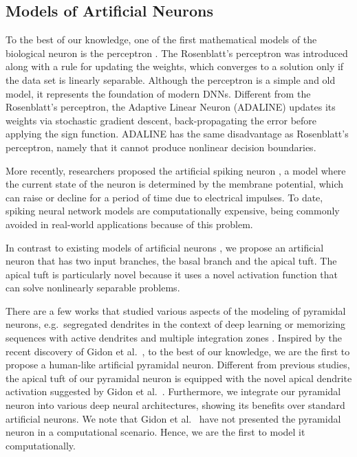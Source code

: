 \documentclass[pdflatex,sn-mathphys]{sn-jnl}
\theoremstyle{thmstyleone}
\theoremstyle{thmstyletwo}\newtheorem{example}{Example}\newtheorem{remark}{Remark}
\theoremstyle{thmstylethree}\newtheorem{definition}{Definition}\DeclareMathOperator{\sinc}{sinc}
\begin{document}
\subsection{Models of Artificial Neurons}
\label{sec_related_models}

To the best of our knowledge, one of the first mathematical models of the biological neuron is the perceptron \citep{Rosenblatt-PR-1958}. The Rosenblatt's perceptron was introduced along with a rule for updating the weights, which converges to a solution only if the data set is linearly separable. Although the perceptron is a simple and old model, it represents the foundation of modern DNNs.
Different from the Rosenblatt's perceptron, the Adaptive Linear Neuron (ADALINE) \citep{Widrow-TR-1960} updates its weights via stochastic gradient descent, back-propagating the error before applying the sign function. ADALINE has the same disadvantage as Rosenblatt's perceptron, namely that it cannot produce nonlinear decision boundaries. 

More recently, researchers proposed the artificial spiking neuron \citep{Anwani-NC-2020,Sarkar-NE-2022,Tavanaei-NN-2019}, a model where the current state of the neuron is determined by the membrane potential, which can raise or decline for a period of time due to electrical impulses. To date, spiking neural network models are computationally expensive, being commonly avoided in real-world applications because of this problem.

In contrast to existing models of artificial neurons \citep{Rosenblatt-PR-1958,Widrow-TR-1960,Anwani-NC-2020,Sarkar-NE-2022,Tavanaei-NN-2019}, we propose an artificial neuron that has two input branches, the basal branch and the apical tuft. The apical tuft is particularly novel because it uses a novel activation function \citep{Gidon-S-2020} that can solve nonlinearly separable problems.

There are a few works that studied various aspects of the modeling of pyramidal neurons, e.g.~segregated dendrites in the context of deep learning \citep{Guerguiev-EL-2017} or memorizing sequences with active dendrites and multiple integration zones \citep{Hawkins-FNC-2016}. Inspired by the recent discovery of Gidon et al.~\cite{Gidon-S-2020}, to the best of our knowledge, we are the first to propose a human-like artificial pyramidal neuron. Different from previous studies, the apical tuft of our pyramidal neuron is equipped with the novel apical dendrite activation suggested by Gidon et al.~\cite{Gidon-S-2020}. Furthermore, we integrate our pyramidal neuron into various deep neural architectures, showing its benefits over standard artificial neurons. We note that Gidon et al.~\cite{Gidon-S-2020} have not presented the pyramidal neuron in a computational scenario. Hence, we are the first to model it computationally. 
\end{document}
